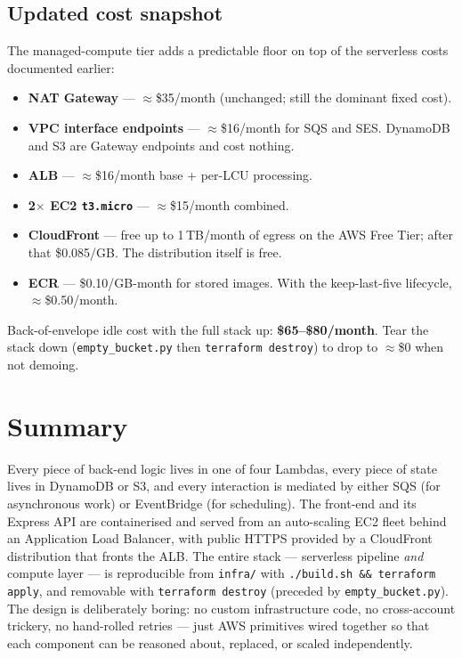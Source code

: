 \documentclass[11pt,a4paper]{article}
\begin{document}
\subsection{Updated cost snapshot}

The managed-compute tier adds a predictable floor on top of the
serverless costs documented earlier:

\begin{itemize}[leftmargin=*]
  \item \textbf{NAT Gateway} --- $\approx$\$35/month (unchanged; still
        the dominant fixed cost).
  \item \textbf{VPC interface endpoints} --- $\approx$\$16/month for SQS
        and SES. DynamoDB and S3 are Gateway endpoints and cost
        nothing.
  \item \textbf{ALB} --- $\approx$\$16/month base + per-LCU processing.
  \item \textbf{2$\times$ EC2 \texttt{t3.micro}} --- $\approx$\$15/month
        combined.
  \item \textbf{CloudFront} --- free up to 1\,TB/month of egress on the
        AWS Free Tier; after that \$0.085/GB. The distribution itself
        is free.
  \item \textbf{ECR} --- \$0.10/GB-month for stored images. With the
        keep-last-five lifecycle, $\approx$\$0.50/month.
\end{itemize}

Back-of-envelope idle cost with the full stack up:
\textbf{\$65--\$80/month}. Tear the stack down (\texttt{empty\_bucket.py}
then \texttt{terraform destroy}) to drop to $\approx$\$0 when not
demoing.

\section{Summary}

Every piece of back-end logic lives in one of four Lambdas, every piece
of state lives in DynamoDB or S3, and every interaction is mediated by
either SQS (for asynchronous work) or EventBridge (for scheduling).
The front-end and its Express API are containerised and served from an
auto-scaling EC2 fleet behind an Application Load Balancer, with public
HTTPS provided by a CloudFront distribution that fronts the ALB. The
entire stack --- serverless pipeline \emph{and} compute layer --- is
reproducible from \texttt{infra/} with \texttt{./build.sh \&\&
terraform apply}, and removable with \texttt{terraform destroy}
(preceded by \texttt{empty\_bucket.py}). The design is deliberately
boring: no custom infrastructure code, no cross-account trickery, no
hand-rolled retries --- just AWS primitives wired together so that each
component can be reasoned about, replaced, or scaled independently.
\end{document}
